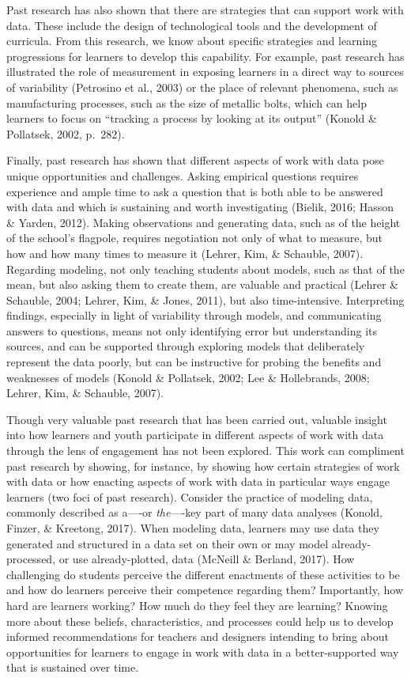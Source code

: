\documentclass[]{msu-thesis}
\theoremstyle{definition}
\theoremstyle{definition}
\theoremstyle{definition}
\theoremstyle{remark}
\begin{document}
Past research has also shown that there are strategies that can support
work with data. These include the design of technological tools and the
development of curricula. From this research, we know about specific
strategies and learning progressions for learners to develop this
capability. For example, past research has illustrated the role of
measurement in exposing learners in a direct way to sources of
variability (Petrosino et al., 2003) or the place of relevant phenomena,
such as manufacturing processes, such as the size of metallic bolts,
which can help learners to focus on ``tracking a process by looking at
its output'' (Konold \& Pollatsek, 2002, p.~282).

Finally, past research has shown that different aspects of work with
data pose unique opportunities and challenges. Asking empirical
questions requires experience and ample time to ask a question that is
both able to be answered with data and which is sustaining and worth
investigating (Bielik, 2016; Hasson \& Yarden, 2012). Making
observations and generating data, such as of the height of the school's
flagpole, requires negotiation not only of what to measure, but how and
how many times to measure it (Lehrer, Kim, \& Schauble, 2007). Regarding
modeling, not only teaching students about models, such as that of the
mean, but also asking them to create them, are valuable and practical
(Lehrer \& Schauble, 2004; Lehrer, Kim, \& Jones, 2011), but also
time-intensive. Interpreting findings, especially in light of
variability through models, and communicating answers to questions,
means not only identifying error but understanding its sources, and can
be supported through exploring models that deliberately represent the
data poorly, but can be instructive for probing the benefits and
weaknesses of models (Konold \& Pollatsek, 2002; Lee \& Hollebrands,
2008; Lehrer, Kim, \& Schauble, 2007).

Though very valuable past research that has been carried out, valuable
insight into how learners and youth participate in different aspects of
work with data through the lens of engagement has not been explored.
This work can compliment past research by showing, for instance, by
showing how certain strategies of work with data or how enacting aspects
of work with data in particular ways engage learners (two foci of past
research). Consider the practice of modeling data, commonly described as
a----or \emph{the}----key part of many data analyses (Konold, Finzer, \&
Kreetong, 2017). When modeling data, learners may use data they
generated and structured in a data set on their own or may model
already-processed, or use already-plotted, data (McNeill \& Berland,
2017). How challenging do students perceive the different enactments of
these activities to be and how do learners perceive their competence
regarding them? Importantly, how hard are learners working? How much do
they feel they are learning? Knowing more about these beliefs,
characteristics, and processes could help us to develop informed
recommendations for teachers and designers intending to bring about
opportunities for learners to engage in work with data in a
better-supported way that is sustained over time.
\end{document}
